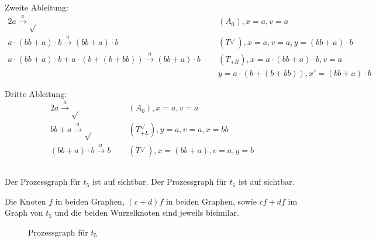 \documentclass[10pt,a4paper,oneside,ngerman,numbers=noenddot]{scrartcl}
\begin{document}
    Zweite Ableitung:
    \begin{alignat*}{2}
        a \overset{a}{\rightarrow} \sqrt{} \;&&\; (A_0), x = a, v = a \\
        a \cdot (bb + a) \cdot b \overset{a}{\rightarrow} (bb + a) \cdot b \;&&\; (T^{\sqrt{}}), x = a, v = a, y = (bb + a) \cdot b \\
        a \cdot (bb + a) \cdot b + a \cdot (b + (b + bb)) \overset{a}{\rightarrow} (bb + a) \cdot b \;&&\; (T_{+R}), x = a \cdot (bb + a) \cdot b, v = a \\
        &&\; y = a \cdot (b + (b + bb)), x' = (bb + a) \cdot b
    \end{alignat*}

    Dritte Ableitung:
    \begin{alignat*}{2}
        a \overset{a}{\rightarrow} \sqrt{} \;&&\; (A_0), x = a, v = a \\
        bb + a \overset{a}{\rightarrow} \sqrt{} \;&&\; (T^{\sqrt{}}_{+L}), y = a, v = a, x = bb \\
        (bb + a) \cdot b \overset{a}{\rightarrow} b \;&&\; (T^{\sqrt{}}), x = (bb + a), v = a, y = b
    \end{alignat*}

    \subsection{}
    Der Prozessgraph für \(t_5\) ist auf  sichtbar. Der Prozessgraph für \(t_6\) ist auf  sichtbar.

    Die Knoten \(f\) in beiden Graphen, \((c + d)f\) in beiden Graphen, sowie \(cf + df\) im Graph von \(t_5\) und die beiden Wurzelknoten sind jeweils bisimilar.
    \begin{figure}
        \caption{Prozessgraph für \(t_5\)}
        \label{fig:t5-graph}
    \end{figure}
\end{document}
